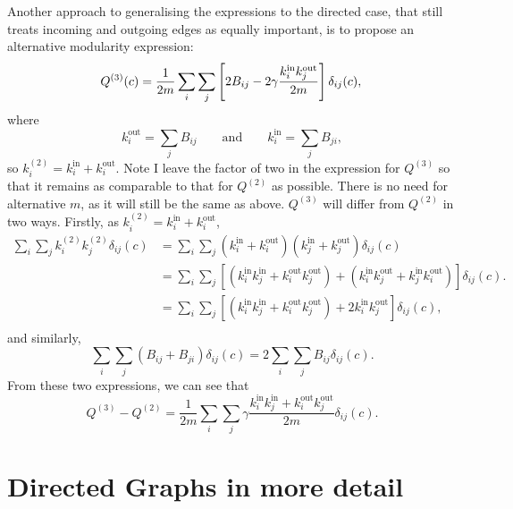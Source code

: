 \documentclass{article}
\begin{document}
Another approach to generalising the expressions to the 
directed case, that still treats incoming and outgoing edges 
as equally important, is to propose an alternative modularity 
expression:
\newcommand{\dkin}[1]{k_{#1}^{\text{in}}}
\newcommand{\dkout}[1]{k_{#1}^{\text{out}}}
\begin{equation}
Q^{(3)}(c) = \frac{1}{2m}\sum_i\sum_j\left[ 2B_{ij} - 2\gamma \frac{\dkin{i}\dkout{j}}{2m} \right] \delta_{ij}(c), \\
\end{equation}
where 
\begin{equation}
\dkout{i} = \sum_j{B_{ij}} 
\quad \quad \text{and} \quad \quad
\dkin{i} = \sum_j{B_{ji}},
\end{equation}
so $k_i^{(2)} = \dkin{i} + \dkout{i}$.
Note I leave the factor of two in the expression for $Q^{(3)}$ so that it 
remains as comparable to that for $Q^{(2)}$ as possible.
There is no need for alternative $m$, as it will still be the same as above.
$Q^{(3)}$ will differ from $Q^{(2)}$ in two ways.
Firstly, as $k_i^{(2)} = \dkin{i} + \dkout{i}$, 
\begin{align*}
\sum_i\sum_j k_i^{(2)} k_j^{(2)} \delta_{ij}(c)  &= \sum_i\sum_j  (\dkin{i} + \dkout{i}) (\dkin{j} + \dkout{j}) \delta_{ij}(c) \\
 &= \sum_i\sum_j \left[ (\dkin{i}\dkin{j} + \dkout{i}\dkout{j}) + (\dkin{i}\dkout{j} + \dkin{j}\dkout{i}) \right] \delta_{ij}(c). \\
 &= \sum_i\sum_j \left[ (\dkin{i}\dkin{j} + \dkout{i}\dkout{j}) + 2\dkin{i}\dkout{j} \right] \delta_{ij}(c), \\
\end{align*}
and similarly,
\begin{equation}
\sum_i\sum_j  \left( B_{ij} + B_{ji} \right) \delta_{ij}(c) = 2\sum_i\sum_j B_{ij} \delta_{ij}(c).
\end{equation}
From these two expressions, we can see that 
\begin{equation}
Q^{(3)} - Q^{(2)} = \frac{1}{2m}\sum_i\sum_j \gamma \frac{\dkin{i}\dkin{j} + \dkout{i}\dkout{j}}{2m} \delta_{ij}(c).
\end{equation}


\section{Directed Graphs in more detail}
\label{sec:directedGraphsDetail}
\end{document}
